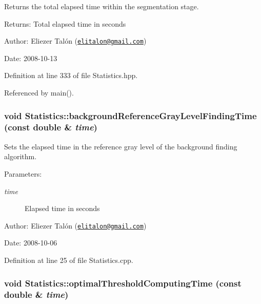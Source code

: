 Returns the total elapsed time within the segmentation stage. 

\begin{Desc}
\item[Returns:]Total elapsed time in seconds\end{Desc}
\begin{Desc}
\item[Author:]Eliezer Talón (\href{mailto:elitalon@gmail.com}{\tt elitalon@gmail.com}) \end{Desc}
\begin{Desc}
\item[Date:]2008-10-13 \end{Desc}


Definition at line 333 of file Statistics.hpp.

Referenced by main().\hypertarget{class_statistics_f8a60e8a89be8fe8b2c46782681c1a2c}{
\subsubsection[backgroundReferenceGrayLevelFindingTime]{\setlength{\rightskip}{0pt plus 5cm}void Statistics::backgroundReferenceGrayLevelFindingTime (const double \& {\em time})}}
\label{class_statistics_f8a60e8a89be8fe8b2c46782681c1a2c}


Sets the elapsed time in the reference gray level of the background finding algorithm. 

\begin{Desc}
\item[Parameters:]
\begin{description}
\item[{\em time}]Elapsed time in seconds\end{description}
\end{Desc}
\begin{Desc}
\item[Author:]Eliezer Talón (\href{mailto:elitalon@gmail.com}{\tt elitalon@gmail.com}) \end{Desc}
\begin{Desc}
\item[Date:]2008-10-06 \end{Desc}


Definition at line 25 of file Statistics.cpp.\hypertarget{class_statistics_eed35a930f29f4596f3715306e1e1dbc}{
\subsubsection[optimalThresholdComputingTime]{\setlength{\rightskip}{0pt plus 5cm}void Statistics::optimalThresholdComputingTime (const double \& {\em time})}}
\label{class_statistics_eed35a930f29f4596f3715306e1e1dbc}


